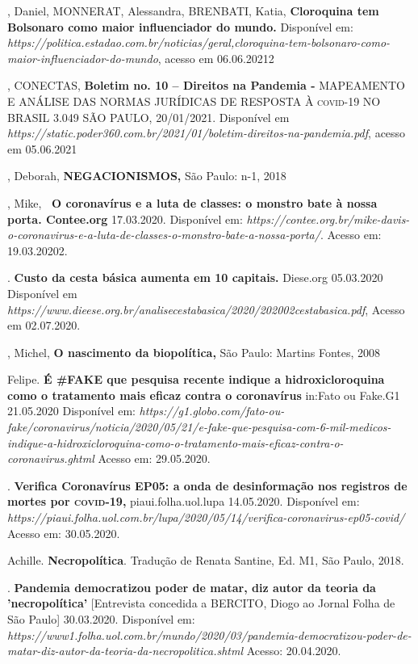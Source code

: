 \begin{bibliohedra}
, Daniel, MONNERAT, Alessandra, BRENBATI, Katia,
\textbf{Cloroquina tem Bolsonaro como maior influenciador do mundo.}
Disponível em:
\textit{https://politica.estadao.com.br/noticias/geral,cloroquina-tem-bolsonaro-como-maior-influenciador-do-mundo},
acesso em 06.06.20212

, CONECTAS, \textbf{Boletim no. 10 -- Direitos na Pandemia -}
MAPEAMENTO E ANÁLISE DAS NORMAS JURÍDICAS DE RESPOSTA À \textsc{covid-19} NO
BRASIL 3.049 SÃO PAULO, 20/01/2021. Disponível em
\textit{https://static.poder360.com.br/2021/01/boletim-direitos-na-pandemia.pdf},
acesso em 05.06.2021

, Deborah, \textbf{NEGACIONISMOS,} São Paulo: n-1, 2018

, Mike, \textbf{~O coronavírus e a luta de classes: o monstro bate
à nossa porta. Contee.org} 17.03.2020. Disponível em:
\textit{https://contee.org.br/mike-davis-o-coronavirus-e-a-luta-de-classes-o-monstro-bate-a-nossa-porta/}.
Acesso em: 19.03.20202.

. \textbf{Custo da cesta básica aumenta em 10 capitais.} Diese.org
05.03.2020 Disponível em
\textit{https://www.dieese.org.br/analisecestabasica/2020/202002cestabasica.pdf},
Acesso em 02.07.2020.

, Michel, \textbf{O nascimento da biopolítica,} São Paulo:
Martins Fontes, 2008

 Felipe. \textbf{É \#FAKE que pesquisa recente indique a
hidroxicloroquina como o tratamento mais eficaz contra o coronavírus}
in:Fato ou Fake.G1 21.05.2020 Disponível em:
\textit{https://g1.globo.com/fato-ou-fake/coronavirus/noticia/2020/05/21/e-fake-que-pesquisa-com-6-mil-medicos-indique-a-hidroxicloroquina-como-o-tratamento-mais-eficaz-contra-o-coronavirus.ghtml}
Acesso em: 29.05.2020.

. \textbf{Verifica Coronavírus EP05: a onda de desinformação nos
registros de mortes por \textsc{covid-19},} piaui.folha.uol.lupa 14.05.2020.
Disponível em:
\textit{https://piaui.folha.uol.com.br/lupa/2020/05/14/verifica-coronavirus-ep05-covid/}
Acesso em: 30.05.2020.

 Achille. \textbf{Necropolítica}. Tradução de Renata Santine, Ed.
M1, São Paulo, 2018.

\titidem. \textbf{Pandemia democratizou poder de matar, diz autor
da teoria da 'necropolítica'} {[}Entrevista concedida a BERCITO, Diogo
ao Jornal Folha de São Paulo{]} 30.03.2020. Disponível em:
\textit{https://www1.folha.uol.com.br/mundo/2020/03/pandemia-democratizou-poder-de-matar-diz-autor-da-teoria-da-necropolitica.shtml}
Acesso: 20.04.2020.


\end{bibliohedra}
